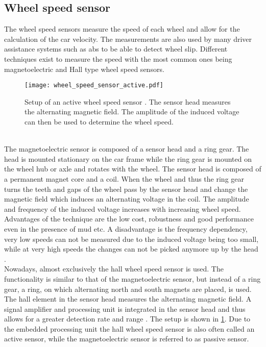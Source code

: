 \subsection{Wheel speed sensor}
The wheel speed sensors measure the speed of each wheel and allow for the calculation of the car velocity.
The measurements are also used by many driver assistance systems such as \gls{abs} to be able to detect wheel slip.
Different techniques exist to measure the speed with the most common ones being magnetoelectric and Hall type wheel speed sensors.
\begin{figure}[htb]
	\centering
	\texttt{[image: wheel\_speed\_sensor\_active.pdf]}
	\caption[Setup of an active wheel speed sensor]{Setup of an active wheel speed sensor \cite{Re2011}. The sensor head measures the alternating magnetic field. The amplitude of the induced voltage can then be used to determine the wheel speed.}
	\label{fig:wheel_speed_sensor_active}
\end{figure}
\\The magnetoelectric sensor is composed of a sensor head and a ring gear.
The head is mounted stationary on the car frame while the ring gear is mounted on the wheel hub or axle and rotates with the wheel.
The sensor head is composed of a permanent magnet core and a coil.
When the wheel and thus the ring gear turns the teeth and gaps of the wheel pass by the sensor head and change the magnetic field which induces an alternating voltage in the coil.
The amplitude and frequency of the induced voltage increases with increasing wheel speed.
Advantages of the technique are the low cost, robustness and good performance even in the presence of mud etc.
A disadvantage is the frequency dependency, very low speeds can not be measured due to the induced voltage being too small, while at very high speeds the changes can not be picked anymore up by the head \cite{AutoReif2014}.\\
Nowadays, almost exclusively the hall wheel speed sensor is used.
The functionality is similar to that of the magnetoelectric sensor, but instead of a ring gear, a ring, on which alternating north and south magnets are placed, is used.
The hall element in the sensor head measures the alternating magnetic field.
A signal amplifier and processing unit is integrated in the sensor head and thus allows for a greater detection rate and range \cite{Re2011}.
The setup is shown in \cref{fig:wheel_speed_sensor_active}.
Due to the embedded processing unit the hall wheel speed sensor is also often called an active sensor, while the magnetoelectric sensor is referred to as passive sensor.



